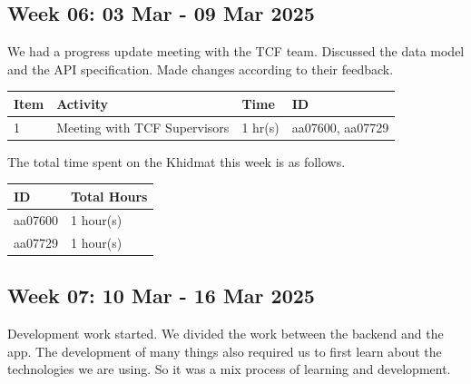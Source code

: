 \documentclass[12pt,a4paper]{article}
\begin{document}
\newpage

\subsection{Week 06: 03 Mar - 09 Mar 2025}
We had a progress update meeting with the TCF team. Discussed the data model and the API specification. Made changes according to their feedback.

\begin{center}
    \bigskip
    \begin{tabular}{|l|l|l|l|}
        \hline
        Item 	& Activity & Time & ID \\\hline\hline
        1	& Meeting with TCF Supervisors & 1 hr(s) & aa07600, aa07729 \\\hline
    \end{tabular}

    \bigskip
    The total time spent on the Khidmat this week is as follows.

    \bigskip
    \begin{tabular}{|l|l|}
        \hline
        ID & Total Hours\\\hline\hline
        aa07600 & 1 hour(s)\\\hline
        aa07729 & 1 hour(s)\\\hline
    \end{tabular}
\end{center}

\newpage

\subsection{Week 07: 10 Mar - 16 Mar 2025}
Development work started. We divided the work between the backend and the app. The development of many things also required us to first learn about the technologies we are using. So it was a mix process of learning and development.
\end{document}
